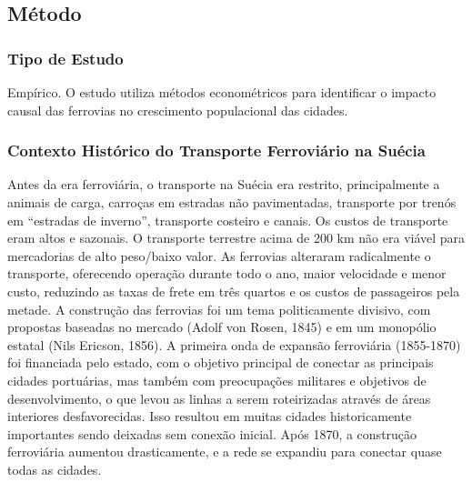 \documentclass[12pt]{article}
\begin{document}
\subsection*{Método}

\subsubsection*{Tipo de Estudo}
Empírico. O estudo utiliza métodos econométricos para identificar o impacto causal das ferrovias no crescimento populacional das cidades.

\subsubsection*{Contexto Histórico do Transporte Ferroviário na Suécia}
Antes da era ferroviária, o transporte na Suécia era restrito, principalmente a animais de carga, carroças em estradas não pavimentadas, transporte por trenós em “estradas de inverno”, transporte costeiro e canais. Os custos de transporte eram altos e sazonais. O transporte terrestre acima de 200 km não era viável para mercadorias de alto peso/baixo valor. As ferrovias alteraram radicalmente o transporte, oferecendo operação durante todo o ano, maior velocidade e menor custo, reduzindo as taxas de frete em três quartos e os custos de passageiros pela metade. A construção das ferrovias foi um tema politicamente divisivo, com propostas baseadas no mercado (Adolf von Rosen, 1845) e em um monopólio estatal (Nils Ericson, 1856). A primeira onda de expansão ferroviária (1855-1870) foi financiada pelo estado, com o objetivo principal de conectar as principais cidades portuárias, mas também com preocupações militares e objetivos de desenvolvimento, o que levou as linhas a serem roteirizadas através de áreas interiores desfavorecidas. Isso resultou em muitas cidades historicamente importantes sendo deixadas sem conexão inicial. Após 1870, a construção ferroviária aumentou drasticamente, e a rede se expandiu para conectar quase todas as cidades.
\end{document}
